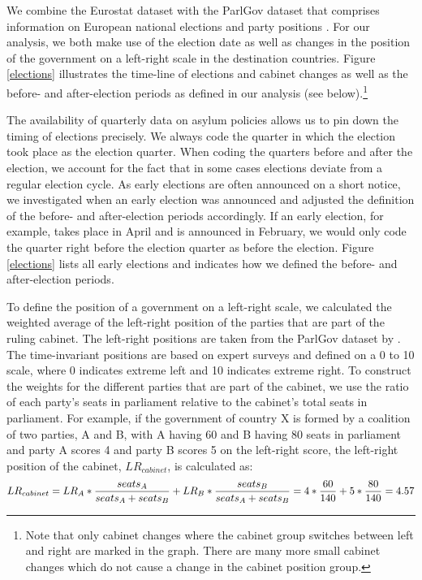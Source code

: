 \documentclass[a4paper,12pt]{article}
\begin{document}


We combine the Eurostat dataset with the ParlGov dataset that comprises information on European national elections and party positions \citep{parlgov2016}. For our analysis, we both make use of the election date as well as changes in the position of the government on a left-right scale in the destination countries. Figure \ref{elections} illustrates the time-line of elections and cabinet changes as well as the before- and after-election periods as defined in our analysis (see below).\footnote{Note that only cabinet changes where the cabinet group switches between left and right are marked in the graph. There are many more small cabinet changes which do not cause a change in the cabinet position group.}

  

The availability of quarterly data on asylum policies allows us to pin down the timing of elections precisely. We always code the quarter in which the election took place as the election quarter. When coding the quarters before and after the election, we account for the fact that in some cases elections deviate from a regular election cycle. As early elections are often announced on a short notice, we investigated when an early election was announced and adjusted the definition of the before- and after-election periods accordingly. If an early election, for example, takes place in April and is announced in February, we would only code the quarter right before the election quarter as before the election. Figure \ref{elections} lists all early elections and indicates how we defined the before- and after-election periods.

To define the position of a government on a left-right scale, we calculated the weighted average of the left-right position of the parties that are part of the ruling cabinet. The left-right positions are taken from the ParlGov dataset by \citet{parlgov2016}. The time-invariant positions are based on expert surveys and defined on a 0 to 10 scale, where 0 indicates extreme left and 10 indicates extreme right. To construct the weights for the different parties that are part of the cabinet, we use the ratio of each party's seats in parliament relative to the cabinet's total seats in parliament. For example, if the government of country X is formed by a coalition of two parties, A and B, with A having 60 and B having 80 seats in parliament and party A scores 4 and party B scores 5 on the left-right score, the left-right position of the cabinet, $LR_{cabinet}$, is calculated as: 
\begin{equation*}
\tiny
LR_{cabinet} = LR_{A} * \frac{seats_{A}}{seats_{A} + seats_{B}} +LR_{B} * \frac{seats_{B}}{seats_{A} + seats_{B}} = 4*\frac{60}{140} +5*\frac{80}{140} = 4.57
\end{equation*}
\end{document}
